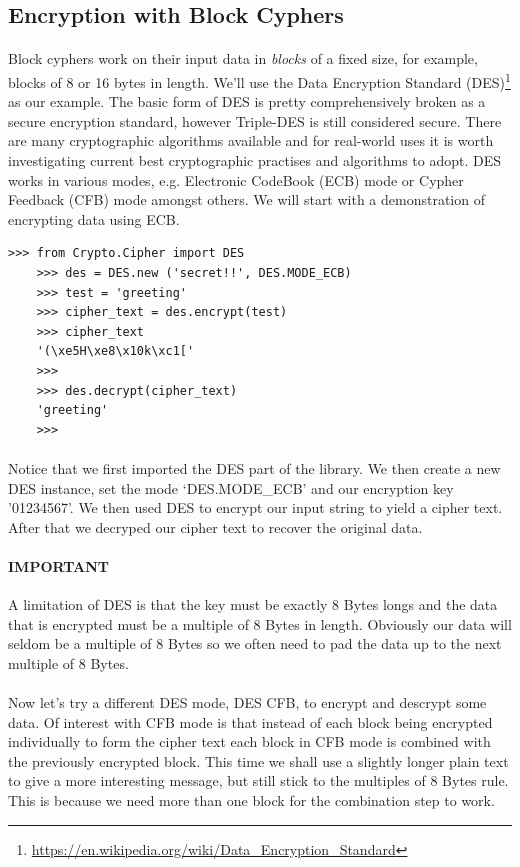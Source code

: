 \documentclass[12pt, a4paper, twoside]{book}
\begin{document}
\subsection{Encryption with Block Cyphers}
\paragraph{} Block cyphers work on their input data in \emph{blocks} of a fixed size, for example, blocks of 8 or 16 bytes in length. We'll use the Data Encryption Standard (DES)\footnote{\url{https://en.wikipedia.org/wiki/Data_Encryption_Standard}} as our example. The basic form of DES is pretty comprehensively broken as a secure encryption standard, however Triple-DES is still considered secure. There are many cryptographic algorithms available and for real-world uses it is worth investigating current best cryptographic practises and algorithms to adopt. DES works in various modes, e.g. Electronic CodeBook (ECB) mode or Cypher Feedback (CFB) mode amongst others. We will start with a demonstration of encrypting data using ECB.

\begin{lstlisting}[style=DOS]
    >>> from Crypto.Cipher import DES
    >>> des = DES.new ('secret!!', DES.MODE_ECB)
    >>> test = 'greeting'
    >>> cipher_text = des.encrypt(test)
    >>> cipher_text
    '(\xe5H\xe8\x10k\xc1['
    >>> 
    >>> des.decrypt(cipher_text)
    'greeting'
    >>> 
\end{lstlisting}

\paragraph{} Notice that we first imported the DES part of the library. We then create a new DES instance, set the mode `DES.MODE\_ECB' and our encryption key '01234567'. We then used DES to encrypt our input string to yield a cipher text. After that we decryped our cipher text to recover the original data.

\paragraph{IMPORTANT} A limitation of DES is that the key must be exactly 8 Bytes longs and the data that is encrypted must be a multiple of 8 Bytes in length. Obviously our data will seldom be a multiple of 8 Bytes so we often need to pad the data up to the next multiple of 8 Bytes.

\paragraph{} Now let's try a different DES mode, DES CFB, to encrypt and descrypt some data. Of interest with CFB mode is that instead of each block being encrypted individually to form the cipher text each block in CFB mode is combined with the previously encrypted block. This time we shall use a slightly longer plain text to give a more interesting message, but still stick to the multiples of 8 Bytes rule. This is because we need more than one block for the combination step to work. 
\end{document}
